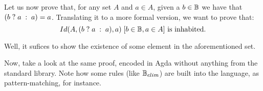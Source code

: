 Let us now prove that, for any set $A$ and $a \in A$, given a $b \in \BB$ we have
that $\ite{b}{a}{a} = a$. Translating it to a more formal version, we want to prove that:
\[
  \withhip{b \in \BB, a \in A}{Id(A, \ite{b}{a}{a}, a)} \text{ is inhabited.}
\]

Well, it sufices to show the existence of some element in the aforementioned set.



Now, take a look at the same proof, encoded in Agda without anything from the standard library.
Note how some rules (like $\BB_{elim}$) are built into the language, as pattern-matching, for instance.


